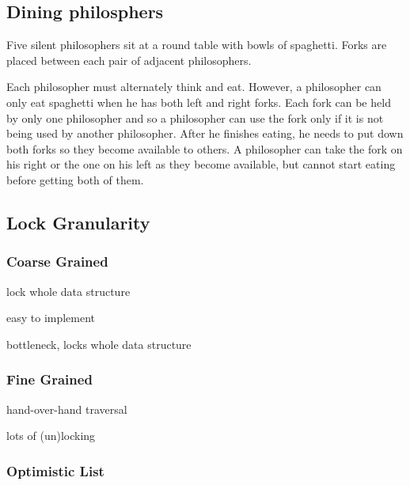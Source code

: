 \documentclass[11pt]{article}
\begin{document}
\subsection{Dining philosphers}

Five silent philosophers sit at a round table with bowls of spaghetti. Forks are placed between each pair of adjacent philosophers.

Each philosopher must alternately think and eat. However, a philosopher can only eat spaghetti when he has both left and right forks. Each fork can be held by only one philosopher and so a philosopher can use the fork only if it is not being used by another philosopher. After he finishes eating, he needs to put down both forks so they become available to others. A philosopher can take the fork on his right or the one on his left as they become available, but cannot start eating before getting both of them.

\subsection{Lock Granularity}

\subsubsection{Coarse Grained}

\begin{description}[noitemsep]
	\item[procedure] lock whole data structure
	\item[advantages] easy to implement
	\item[disadvantages] bottleneck, locks whole data structure
\end{description}

\subsubsection{Fine Grained}

\begin{description}[noitemsep]
	\item[procedure] hand-over-hand traversal
	\item[disadvantages] lots of (un)locking
\end{description}

\subsubsection{Optimistic List}
\end{document}
